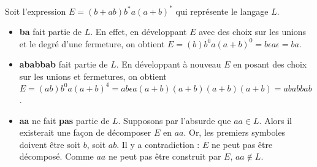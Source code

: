 \begin{exemple}
	Soit l'expression $E = (b+ab)b^*a(a+b)^*$ qui représente le langage $L$.\\
	\begin{itemize}
		\item \textbf{ba} fait partie de $L$. En effet, en développant $E$ avec des choix sur les unions et le degré d'une fermeture, on obtient  $E= (b)b^0a(a+b)^0 = b\epsilon a \epsilon = ba$.
		\item \textbf{ababbab} fait partie de $L$. En développant à nouveau $E$ en posant des choix sur les unions et fermetures, on obtient $E=(ab)b^0a(a+b)^4 = ab\epsilon a (a+b)(a+b)(a+b)(a+b) = ababbab$.
		\item \textbf{aa} ne fait \textbf{pas} partie de $L$. Supposons par l'absurde que $aa \in L$. Alors il existerait une façon de décomposer $E$ en $aa$. Or, les premiers symboles doivent être soit $b$, soit $ab$. Il y a contradiction : $E$ ne peut pas être décomposé. Comme $aa$ ne peut pas être construit par $E$, $aa \notin L$.
	\end{itemize}
	\label{ex:regex}
\end{exemple}